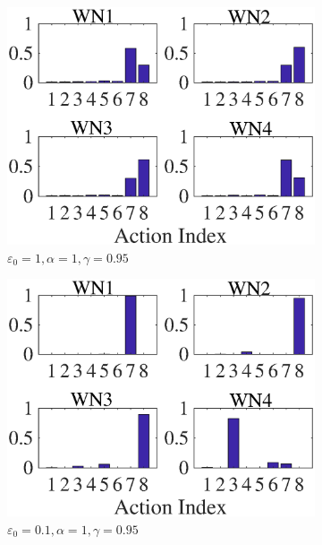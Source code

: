 \documentclass{article}
\begin{document}
	\begin{figure}[]
		\centering
		\begin{subfigure}[b]{0.225\textwidth}
			\includegraphics[width=\textwidth]{images/e_1_a1_g095}
			\caption{$\varepsilon_0=1, \alpha=1, \gamma=0.95$}
			\label{fig:e_1_a1_g095}
		\end{subfigure}
		\begin{subfigure}[b]{0.225\textwidth}
			\includegraphics[width=\textwidth]{images/e_01_a_1_g_095}
			\caption{$\varepsilon_0=0.1, \alpha=1, \gamma=0.95$}
			\label{fig:e_1_a_1_g_095}
		\end{subfigure}
		\begin{subfigure}[b]{0.225\textwidth}

\end{subfigure}
\end{figure}
\end{document}
